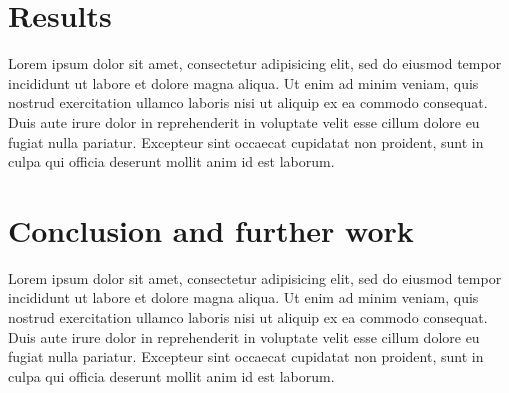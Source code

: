 \documentclass[times, utf8, seminar]{fer}
\begin{document}
\chapter{Results}

Lorem ipsum dolor sit amet, consectetur adipisicing elit, sed do eiusmod tempor incididunt ut labore et dolore magna aliqua. Ut enim ad minim veniam, quis nostrud exercitation ullamco laboris nisi ut aliquip ex ea commodo consequat. Duis aute irure dolor in reprehenderit in voluptate velit esse cillum dolore eu fugiat nulla pariatur. Excepteur sint occaecat cupidatat non proident, sunt in culpa qui officia deserunt mollit anim id est laborum.
\chapter{Conclusion and further work}
Lorem ipsum dolor sit amet, consectetur adipisicing elit, sed do eiusmod tempor incididunt ut labore et dolore magna aliqua. Ut enim ad minim veniam, quis nostrud exercitation ullamco laboris nisi ut aliquip ex ea commodo consequat. Duis aute irure dolor in reprehenderit in voluptate velit esse cillum dolore eu fugiat nulla pariatur. Excepteur sint occaecat cupidatat non proident, sunt in culpa qui officia deserunt mollit anim id est laborum.
% 
% 
% 
\end{document}
